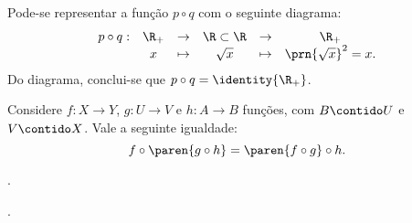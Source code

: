 \begin{solution}
Pode-se representar a função $p \circ q$ com o seguinte diagrama:
%
\begin{equation*}
\begin{array}{cccccc}
p \circ q : & \R_+ & \to     & \R \subset \R & \to     & \R_+ \\
		  &  x  & \mapsto & \sqrt x       & \mapsto & \prn{\sqrt x}^2 = x.
\end{array}
\end{equation*}
%
Do diagrama, conclui-se que $p \circ q = \identity{\R_+}$.
\end{solution}

\begin{proposition}
	Considere $f : X \to Y $, $g : U \to V $ e $h: A \to B $ funções, com $B \contido U$ e $V \contido X$. Vale a seguinte igualdade:
	$$f \circ \paren{g \circ h} = \paren{f \circ g} \circ h.$$ 
\end{proposition}

\begin{onlineact}
	.
\end{onlineact}

\begin{onlineact}
	.
\end{onlineact}